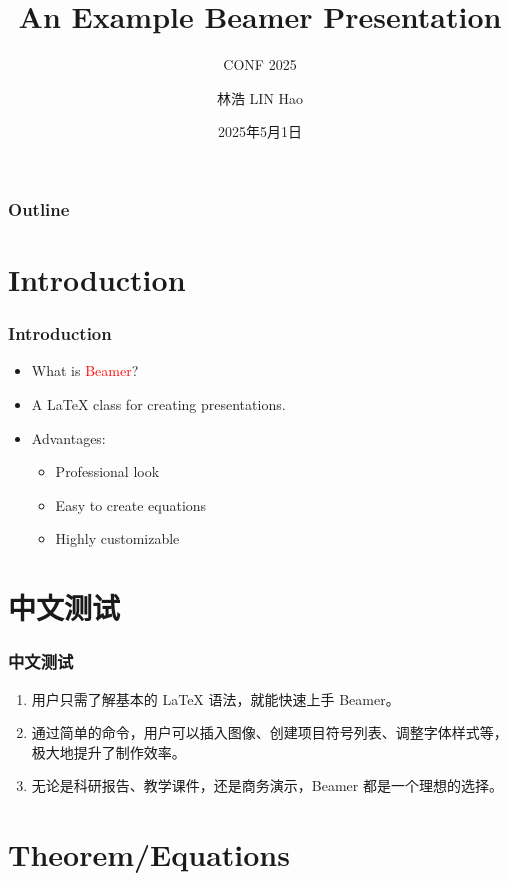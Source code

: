 \documentclass{cls/simplebeamer}
\begin{document}
\begin{frame}[plain]
  \title{An Example Beamer Presentation}
  \subtitle{CONF 2025}
  \author{林浩 LIN Hao}
  \date{2025年5月1日}
  \titlepage
\end{frame}

\begin{frame}
  \frametitle{Outline}
  \tableofcontents
\end{frame}

\section{Introduction}

\begin{frame}
  \frametitle{Introduction}
  \begin{itemize}
    \item What is \textcolor{red}{Beamer}?
    \item A \textcolor{structure}{\LaTeX} class for creating presentations.
    \item Advantages:
      \begin{itemize}
        \item Professional look
        \item Easy to create equations
        \item Highly customizable
      \end{itemize}
  \end{itemize}
\end{frame}

\section{中文测试}

\begin{frame}
  \frametitle{中文测试}
  \begin{enumerate}
    \item 用户只需了解基本的 LaTeX 语法，就能快速上手 Beamer。
    \item 通过简单的命令，用户可以插入图像、创建项目符号列表、调整字体样式等，极大地提升了制作效率。
    \item 无论是科研报告、教学课件，还是商务演示，Beamer 都是一个理想的选择。
  \end{enumerate}
\end{frame}

\section{Theorem/Equations}
\end{document}
